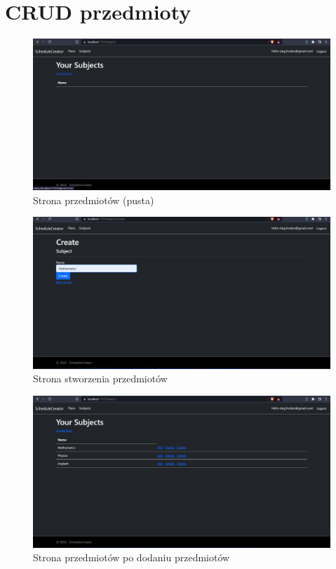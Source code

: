 \documentclass[a4paper,12pt,oneside]{book} %
\begin{document}
\chapter*{CRUD przedmioty}

\begin{figure}[h]
    \centering\includegraphics[width=14cm]{6.png}
    \caption{Strona przedmiotów (pusta)}
\end{figure}

\begin{figure}[h]
    \centering\includegraphics[width=14cm]{7.png}
    \caption{Strona stworzenia przedmiotów}
\end{figure}


\begin{figure}[h]
    \centering\includegraphics[width=14cm]{8.png}
    \caption{Strona przedmiotów po dodaniu przedmiotów}
\end{figure}
\end{document}
